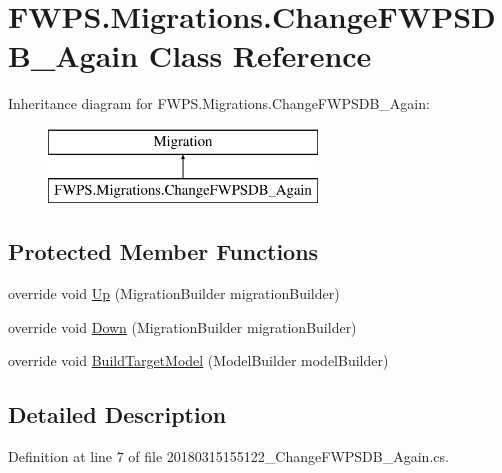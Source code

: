 \hypertarget{class_f_w_p_s_1_1_migrations_1_1_change_f_w_p_s_d_b___again}{}\section{F\+W\+P\+S.\+Migrations.\+Change\+F\+W\+P\+S\+D\+B\+\_\+\+Again Class Reference}
\label{class_f_w_p_s_1_1_migrations_1_1_change_f_w_p_s_d_b___again}
Inheritance diagram for F\+W\+P\+S.\+Migrations.\+Change\+F\+W\+P\+S\+D\+B\+\_\+\+Again\+:\begin{figure}[H]
\begin{center}
\leavevmode
\includegraphics[height=2.000000cm]{class_f_w_p_s_1_1_migrations_1_1_change_f_w_p_s_d_b___again}
\end{center}
\end{figure}
\subsection*{Protected Member Functions}
\begin{DoxyCompactItemize}
\item 
override void \mbox{\hyperlink{class_f_w_p_s_1_1_migrations_1_1_change_f_w_p_s_d_b___again_ab3ddf50d2bbd2a1a80dd27eafde0b453}{Up}} (Migration\+Builder migration\+Builder)
\item 
override void \mbox{\hyperlink{class_f_w_p_s_1_1_migrations_1_1_change_f_w_p_s_d_b___again_a908809bc4cd70a495ed782c7a32b3820}{Down}} (Migration\+Builder migration\+Builder)
\item 
override void \mbox{\hyperlink{class_f_w_p_s_1_1_migrations_1_1_change_f_w_p_s_d_b___again_a3833a9a1f4e54899f00fa7a2769d72d8}{Build\+Target\+Model}} (Model\+Builder model\+Builder)
\end{DoxyCompactItemize}


\subsection{Detailed Description}


Definition at line 7 of file 20180315155122\+\_\+\+Change\+F\+W\+P\+S\+D\+B\+\_\+\+Again.\+cs.



